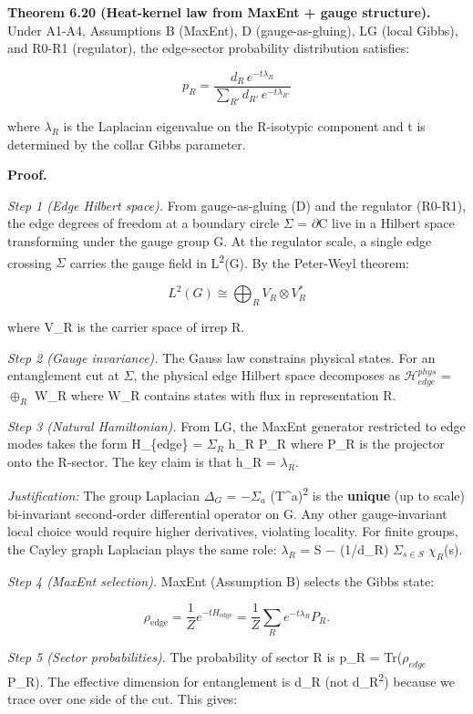 \documentclass[11pt,a4paper]{article}
\theoremstyle{remark}
\begin{document}
\textbf{Theorem 6.20 (Heat-kernel law from MaxEnt + gauge structure).} Under A1-A4,
Assumptions B (MaxEnt), D (gauge-as-gluing), LG (local Gibbs), and R0-R1
(regulator), the edge-sector probability distribution satisfies:

\[
p_R = \frac{d_R \, e^{-t \lambda_R}}{\sum_{R'} d_{R'} \, e^{-t \lambda_{R'}}}
\]

where $\lambda_R$ is the Laplacian eigenvalue on the R-isotypic component
and t is determined by the collar Gibbs parameter.

\textbf{Proof.}

\emph{Step 1 (Edge Hilbert space).} From gauge-as-gluing (D) and the regulator
(R0-R1), the edge degrees of freedom at a boundary circle \ensuremath{\Sigma} = \ensuremath{\partial}C
live in a Hilbert space transforming under the gauge group G. At the
regulator scale, a single edge crossing \ensuremath{\Sigma} carries the gauge field in
L\textsuperscript{2}(G). By the Peter-Weyl theorem:

\[
L^2(G) \cong \bigoplus_R V_R \otimes V_R^*
\]

where V\_R is the carrier space of irrep R.

\emph{Step 2 (Gauge invariance).} The Gauss law constrains physical states. For an
entanglement cut at \ensuremath{\Sigma}, the physical edge Hilbert space decomposes as
$\mathcal{H}_{edge}^{phys}$ = $\oplus_R$ W\_R where W\_R
contains states with flux in representation R.

\emph{Step 3 (Natural Hamiltonian).} From LG, the MaxEnt generator restricted to
edge modes takes the form H\_\{edge\} = $\Sigma_R$ h\_R P\_R where P\_R is
the projector onto the R-sector. The key claim is that h\_R = $\lambda_R$.

\emph{Justification:} The group Laplacian $\Delta_G$ = \ensuremath{-}$\Sigma_a$ (T\^{}a)\textsuperscript{2} is the
\textbf{unique} (up to scale) bi-invariant second-order differential operator on
G. Any other gauge-invariant local choice would require higher derivatives,
violating locality. For finite groups, the Cayley graph Laplacian plays the
same role: $\lambda_R$ = \textbar S\textbar{} \ensuremath{-} (1/d\_R) $\Sigma_{s\ensuremath{\in}S}$ $\chi_R$(s).

\emph{Step 4 (MaxEnt selection).} MaxEnt (Assumption B) selects the Gibbs state:

\[
\rho_{\mathrm{edge}} = \frac{1}{Z} e^{-t H_{\mathrm{edge}}} = \frac{1}{Z}
\sum_R e^{-t \lambda_R} P_R.
\]

\emph{Step 5 (Sector probabilities).} The probability of sector R is
p\_R = Tr($\rho_{edge}$ P\_R). The effective dimension for
entanglement is d\_R (not d\_R\textsuperscript{2}) because we trace over one side of the
cut. This gives:
\end{document}

